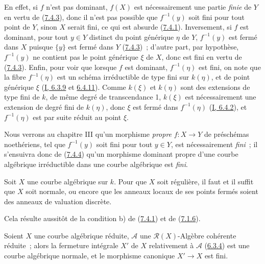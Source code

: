 En effet, si $f$ n'est pas dominant, $f(X)$ est nécessairement une partie
\emph{finie} de $Y$ en vertu de (\hyperref[II.7.4.3-fr]{7.4.3}), donc il n'est
pas possible que $f^{-1}(y)$ soit fini pour tout point de $Y$, sinon $X$ serait
fini, ce qui est absurde (\hyperref[II.7.4.1-fr]{7.4.1}). Inversement, si $f$
est dominant, pour tout $y\in Y$ distinct du point générique $\eta$ de $Y$,
$f^{-1}(y)$ est fermé dans $X$ puisque $\{y\}$ est fermé dans $Y$
(\hyperref[II.7.4.3-fr]{7.4.3})~; d'autre part, par hypothèse, $f^{-1}(y)$ ne
contient pas le point générique $\xi$ de $X$, donc est fini en vertu de
(\hyperref[II.7.4.3-fr]{7.4.3}). Enfin, pour voir que lorsque $f$ est dominant,
$f^{-1}(\eta)$ est fini, on note que la fibre $f^{-1}(\eta)$ est un schéma
irréductible de type fini sur $k(\eta)$, et de point générique $\xi$
(\hyperref[I.6.3.9-fr]{I, 6.3.9} et
\hyperref[I.6.4.11-fr]{6.4.11}). Comme $k(\xi)$ et $k(\eta)$ sont des
extensions de type fini de $k$, de même degré de transcendance 1, $k(\xi)$ est
nécessairement une extension de degré fini de $k(\eta)$, donc $\xi$ est fermé
dans $f^{-1}(\eta)$ (\hyperref[I.6.4.2-fr]{I, 6.4.2}), et $f^{-1}(\eta)$ est
par suite réduit au point $\xi$.

Nous verrons au chapitre III qu'un morphisme \emph{propre} $f:X\to Y$ de
préschémas noethériens, tel que $f^{-1}(y)$ soit fini pour tout $y\in Y$, est
nécessairement \emph{fini}~; il s'ensuivra donc de
(\hyperref[II.7.4.4-fr]{7.4.4}) qu'un morphisme dominant propre d'une courbe
algébrique irréductible dans une courbe algébrique est \emph{fini}.

\begin{corollary}[7.4.5]
\label{II.7.4.5-fr}
Soit $X$ une courbe algébrique sur $k$. Pour que $X$ soit régulière, il faut et
il suffit que $X$ soit normale, ou encore que les anneaux locaux de ses points
fermés soient des anneaux de valuation discrète.
\end{corollary}

Cela résulte aussitôt de la condition b) de
(\hyperref[II.7.4.1-fr]{7.4.1}) et de
(\hyperref[II.7.1.6-fr]{7.1.6}).

\begin{corollary}[7.4.6]
\label{II.7.4.6-fr}
Soient $X$ une courbe algébrique réduite, $\mathcal{A}$ une
$\mathcal{R}(X)$-Algèbre cohérente réduite~; alors la fermeture intégrale $X'$
de $X$ relativement à $\mathcal{A}$ (\hyperref[II.6.3.4-fr]{6.3.4}) est une
courbe algébrique normale, et le morphisme canonique $X'\to X$ est fini.
\end{corollary}

